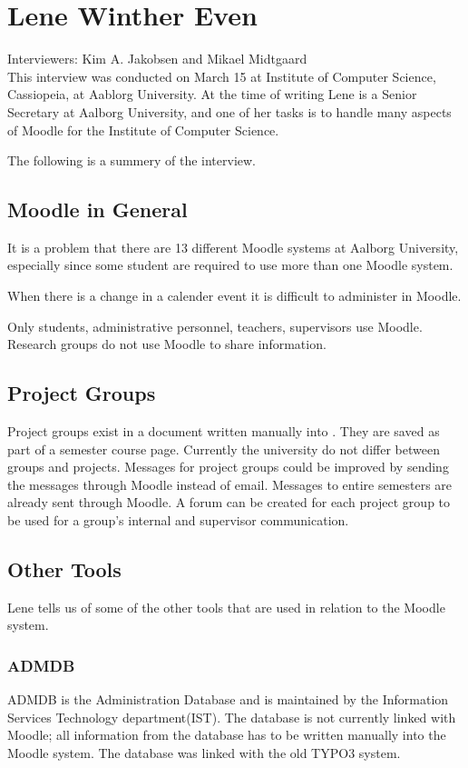 \section{Lene Winther Even}
\label{sec:lene}
Interviewers: Kim A. Jakobsen and Mikael Midtgaard\\


This interview was conducted on March 15\ths{} at Institute of Computer Science, Cassiopeia, at Aablorg University.
At the time of writing Lene is a Senior Secretary at Aalborg University, and one of her tasks is to handle many aspects of Moodle for the Institute of Computer Science.

The following is a summery of the interview.

\subsection*{Moodle in General}
It is a problem that there are 13 different Moodle systems at Aalborg University, especially since some student are required to use more than one Moodle system.

When there is a change in a calender event it is difficult to administer in Moodle.

Only students, administrative personnel, teachers, supervisors use Moodle.
Research groups do not use Moodle to share information.

\subsection*{Project Groups}
Project groups exist in a document written manually into \moodle{}.
They are saved as part of a semester course page.
Currently the university do not differ between groups and projects.
Messages for project groups could be improved by sending the messages through Moodle instead of email.
Messages to entire semesters are already sent through Moodle.
A forum can be created for each project group to be used for a group's internal and supervisor communication.

\subsection*{Other Tools}
Lene tells us of some of the other tools that are used in relation to the Moodle system.

\subsubsection*{ADMDB}
ADMDB is the Administration Database and is maintained by the Information Services Technology department(IST).
The database is not currently linked with Moodle; all information from the database has to be written manually into the Moodle system.
The database was linked with the old TYPO3 system.

